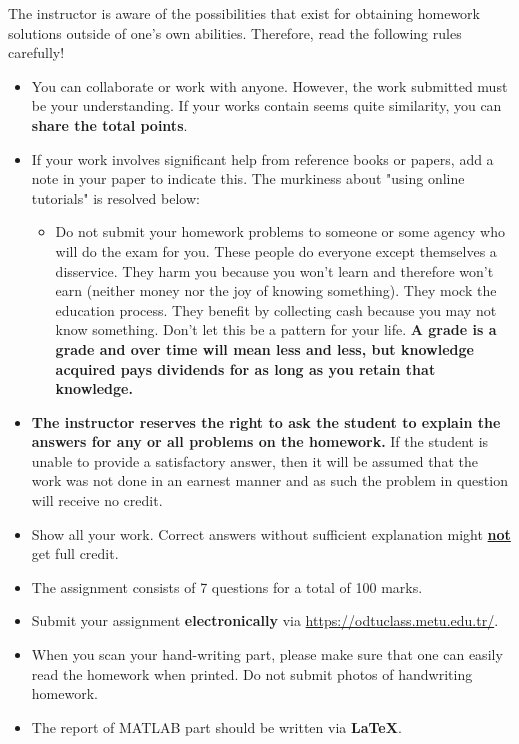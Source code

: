 \documentclass[a4paper,11pt]{article}
\begin{document}

\noindent The instructor is aware of the possibilities that exist for obtaining homework solutions outside of one’s own abilities. Therefore, read the following rules carefully!
\begin{itemize}
    \setlength\itemsep{0.5em}
    \item You can collaborate or work with anyone. However, the work submitted must be your understanding. If your works contain seems quite similarity,  you can \textbf{share the total points}.
    \item If your work involves  significant help from reference books or papers, add a note in your paper to indicate this. The murkiness about "using online tutorials" is resolved below:
    \begin{itemize}
    \item Do not submit your homework problems to someone or some agency who will do the exam for you. These people do everyone except themselves a disservice. They harm you because you won’t learn and therefore won’t earn (neither money nor the joy of knowing something). They mock the education process. They benefit by collecting cash because you may not know something. Don’t let this be a pattern for your life. \textbf{A grade is a grade and over time will mean less and less, but knowledge acquired pays dividends for as long as you retain that knowledge.}
    \end{itemize}
    \item \textbf{The instructor reserves the right to ask the student to explain the answers for any or all problems on the homework.} If the student is unable to provide a satisfactory answer, then it will be assumed that the work was not done in an earnest manner and as such the problem in question will receive no credit.
    \item Show all your work. Correct answers without sufficient explanation might \underline{\textbf{not}} get full credit.
	\item The assignment consists of 7 questions for a total of 100 marks.
	\item Submit your assignment \textbf{electronically} via \url{https://odtuclass.metu.edu.tr/}.
	\item When you scan your hand-writing part, please make sure that one can easily read the homework when printed. Do not submit photos of handwriting homework.
	\item The report of MATLAB part should be written via \textbf{\LaTeX}.

\end{itemize}
\end{document}
